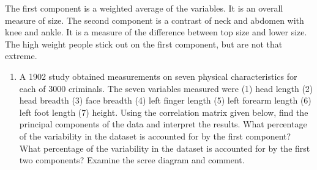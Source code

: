 \documentclass[]{article}
\providecommand{\tightlist}{%
  \setlength{\itemsep}{0pt}\setlength{\parskip}{0pt}}
\begin{document}
The first component is a weighted average of the variables. It is an
overall measure of size. The second component is a contrast of neck and
abdomen with knee and ankle. It is a measure of the difference between
top size and lower size. The high weight people stick out on the first
component, but are not that extreme.

\begin{enumerate}
\def\labelenumi{\arabic{enumi}.}
\setcounter{enumi}{2}
\tightlist
\item
  A 1902 study obtained measurements on seven physical characteristics
  for each of 3000 criminals. The seven variables measured were (1) head
  length (2) head breadth (3) face breadth (4) left finger length (5)
  left forearm length (6) left foot length (7) height. Using the
  correlation matrix given below, find the principal components of the
  data and interpret the results. What percentage of the variability in
  the dataset is accounted for by the first component? What percentage
  of the variability in the dataset is accounted for by the first two
  components? Examine the scree diagram and comment.
\end{enumerate}
\end{document}
